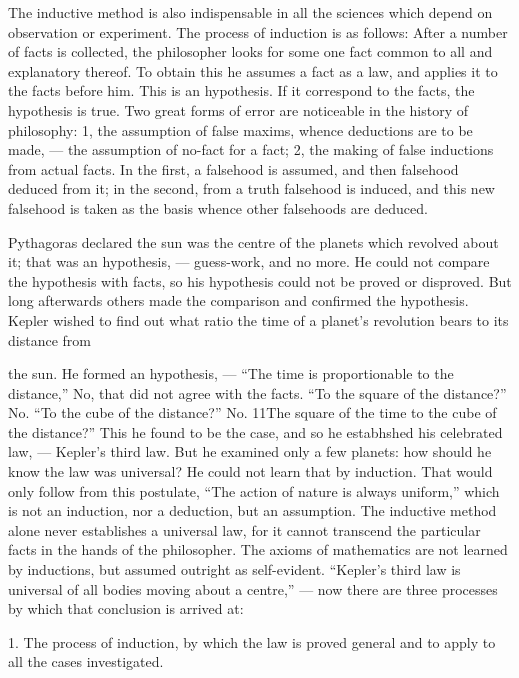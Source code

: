 \documentclass[12pt]{article}
\begin{document}
The inductive method is also indispensable in all the 
sciences which depend on observation or experiment. 
The process of induction is as follows: After a number of facts is collected, the philosopher looks for some 
one fact common to all and explanatory thereof. To 
obtain this he assumes a fact as a law, and applies it to 
the facts before him. This is an hypothesis. If it 
correspond to the facts, the hypothesis is true. Two 
great forms of error are noticeable in the history of 
philosophy: 1, the assumption of false maxims, whence 
deductions are to be made, --- the assumption of no-fact 
for a fact; 2, the making of false inductions from 
actual facts. In the first, a falsehood is assumed, and 
then falsehood deduced from it; in the second, from a 
truth falsehood is induced, and this new falsehood is 
taken as the basis whence other falsehoods are deduced. 

Pythagoras declared the sun was the centre of the 
planets which revolved about it; that was an hypothesis, --- guess-work, and no more. He could not 
compare the hypothesis with facts, so his hypothesis 
could not be proved or disproved. But long afterwards others made the comparison and confirmed the 
hypothesis. Kepler wished to find out what ratio the 
time of a planet's revolution bears to its distance from 




the sun. He formed an hypothesis, --- ``The time is 
proportionable to the distance,'' No, that did not 
agree with the facts. ``To the square of the distance?'' No. ``To the cube of the distance?'' No. 
11The square of the time to the cube of the distance?'' 
This he found to be the case, and so he estabhshed his 
celebrated law, --- Kepler's third law. But he examined only a few planets: how should he know the law 
was universal? He could not learn that by induction. 
That would only follow from this postulate, ``The 
action of nature is always uniform,'' which is not an 
induction, nor a deduction, but an assumption. The 
inductive method alone never establishes a universal 
law, for it cannot transcend the particular facts in 
the hands of the philosopher. The axioms of mathematics are not learned by inductions, but assumed outright as self-evident. ``Kepler's third law is universal 
of all bodies moving about a centre,'' --- now there are 
three processes by which that conclusion is arrived at: 

1. The process of induction, by which the law is proved 
general and to apply to all the cases investigated. 
\end{document}
